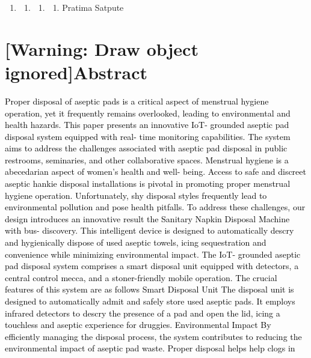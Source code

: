 \documentclass[letterpaper]{article}
\newcounter{saveenum}
\newcommand\liststyleWWNumvi{%
\renewcommand\theenumi{\Alph{enumi}}
\renewcommand\theenumii{\Alph{enumi}.\Alph{enumii}}
\renewcommand\theenumiii{\Alph{enumi}.\Alph{enumii}.\Alph{enumiii}}
\renewcommand\theenumiv{\arabic{enumiv}}
\renewcommand\labelenumi{\theenumi}
\renewcommand\labelenumii{\theenumii}
\renewcommand\labelenumiii{\theenumiii}
\renewcommand\labelenumiv{\theenumiv.}
}
\begin{document}
\bigskip

\liststyleWWNumvi
\setcounter{saveenum}{\value{enumi}}
\begin{enumerate}
\setcounter{enumi}{\value{saveenum}}
\item \setcounter{saveenum}{\value{enumii}}
\begin{enumerate}
\setcounter{enumii}{\value{saveenum}}
\item \setcounter{saveenum}{\value{enumiii}}
\begin{enumerate}
\setcounter{enumiii}{\value{saveenum}}
\item \setcounter{saveenum}{\value{enumiv}}
\begin{enumerate}
\setcounter{enumiv}{\value{saveenum}}
\item \textcolor[rgb]{0.09019608,0.21176471,0.3647059}{Pratima Satpute}
\end{enumerate}
\end{enumerate}
\end{enumerate}
\end{enumerate}
\clearpage\setcounter{page}{1}\pagestyle{Convertediv}
\section[Abstract]{[Warning: Draw object ignored]Abstract}

\bigskip

{\raggedleft
\textcolor{black}{Proper disposal of aseptic pads is a critical aspect of menstrual hygiene operation, yet it frequently
remains overlooked, leading to environmental and health hazards. This paper presents an innovative IoT- grounded
aseptic pad disposal system equipped with real- time monitoring capabilities. The system aims to address the challenges
associated with aseptic pad disposal in public restrooms, seminaries, and other collaborative spaces. Menstrual hygiene
is a abecedarian aspect of women's health and well- being. Access to safe and discreet aseptic hankie disposal
installations is pivotal in promoting proper menstrual hygiene operation. Unfortunately, shy disposal styles frequently
lead to environmental pollution and pose health pitfalls. To address these challenges, our design introduces an
innovative result the Sanitary Napkin Disposal Machine with bus- discovery. This intelligent device is designed to
automatically descry and hygienically dispose of used aseptic towels, icing sequestration and convenience while
minimizing environmental impact. The IoT- grounded aseptic pad disposal system comprises a smart disposal unit equipped
with detectors, a central control mecca, and a stoner-friendly mobile operation. The crucial features of this system
are as follows Smart Disposal Unit The disposal unit is designed to automatically admit and safely store used aseptic
pads. It employs infrared detectors to descry the presence of a pad and open the lid, icing a touchless and aseptic
experience for druggies. Environmental Impact By efficiently managing the disposal process, the system contributes to
reducing the environmental impact of aseptic pad waste. Proper disposal helps help clogs in}
\par}
\end{document}
